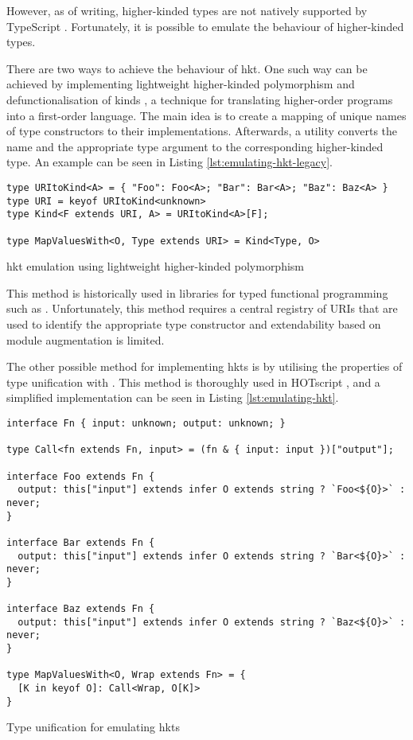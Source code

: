 However, as of writing, higher-kinded types are not natively supported by TypeScript \cite{DocumentationTypeScriptFunctional}. Fortunately, it is possible to emulate the behaviour of higher-kinded types.

There are two ways to achieve the behaviour of \acrshort{hkt}. One such way can be achieved by implementing lightweight higher-kinded polymorphism \cite{yallopLightweightHigherKindedPolymorphism2014} and defunctionalisation of kinds \cite{reynoldsDefinitionalInterpretersHigherorder1972}, a technique for translating higher-order programs into a first-order language. The main idea is to create a mapping of unique names of type constructors to their implementations. Afterwards, a  utility converts the name and the appropriate type argument to the corresponding higher-kinded type. An example can be seen in Listing \ref{lst:emulating-hkt-legacy}.

\begin{listing}[ht]
  \begin{verbatim}
type URItoKind<A> = { "Foo": Foo<A>; "Bar": Bar<A>; "Baz": Baz<A> }
type URI = keyof URItoKind<unknown>
type Kind<F extends URI, A> = URItoKind<A>[F];

type MapValuesWith<O, Type extends URI> = Kind<Type, O>
\end{verbatim}
  \caption{\acrshort{hkt} emulation using lightweight higher-kinded polymorphism}\label{lst:emulating-hkt-legacy}
\end{listing}

This method is historically used in libraries for typed functional programming such as  \cite{GcantiFptsFunctional}. Unfortunately, this method requires a central registry of URIs that are used to identify the appropriate type constructor and extendability based on module augmentation is limited.

The other possible method for implementing \acrshort{hkt}s is by utilising the properties of type unification with . This method is thoroughly used in HOTscript \cite{vergnaudHigherOrderTypeScriptHOTScript2023}, and a simplified implementation can be seen in Listing \ref{lst:emulating-hkt}.

\begin{listing}[ht]
  \begin{verbatim}
interface Fn { input: unknown; output: unknown; }

type Call<fn extends Fn, input> = (fn & { input: input })["output"];

interface Foo extends Fn {
  output: this["input"] extends infer O extends string ? `Foo<${O}>` : never;
}

interface Bar extends Fn {
  output: this["input"] extends infer O extends string ? `Bar<${O}>` : never;
}

interface Baz extends Fn {
  output: this["input"] extends infer O extends string ? `Baz<${O}>` : never;
}

type MapValuesWith<O, Wrap extends Fn> = {
  [K in keyof O]: Call<Wrap, O[K]>
}
\end{verbatim}
  \caption{Type unification for emulating \acrshort{hkt}s}\label{lst:emulating-hkt}
\end{listing}

